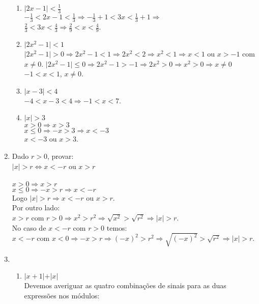 \documentclass[10pt]{book}
\begin{document}
\begin{enumerate}
\begin{enumerate}
		\item
		$\vert 2x - 1 \vert < \frac{1}{3}$\\
		$-\frac{1}{3} < 2x - 1 < \frac{1}{3} \Rightarrow -\frac{1}{3} + 1 < 3x < \frac{1}{3} + 1 \Rightarrow$\\
		$\frac{2}{3} < 3x < \frac{4}{3} \Rightarrow \frac{2}{9} < x < \frac{4}{9}$.
		\item
		$\vert 2x^2 - 1 \vert < 1$\\
		$\vert 2x^2 - 1 \vert > 0 \Rightarrow 2x^2 - 1 < 1 \Rightarrow 2x^2 < 2 \Rightarrow x^2 < 1 \Rightarrow x < 1$ ou $x > -1$ com $x \neq 0$.
		$\vert 2x^2 - 1 \vert \leq 0 \Rightarrow 2x^2 - 1 > -1 \Rightarrow 2x^2 > 0 \Rightarrow x^2 > 0 \Rightarrow x \neq 0$\\
		$-1 < x < 1$, $x \neq 0$.
		\item
		$\vert x - 3 \vert < 4$\\
		$-4 <  x - 3 < 4 \Rightarrow -1 < x < 7$.
		\item
		$\vert x \vert > 3$\\		
		$x > 0 \Rightarrow x > 3$\\
		$x \leq 0 \Rightarrow -x > 3 \Rightarrow x < -3$\\
		$x < -3$ ou $x > 3$.
	\end{enumerate}
	\item 
		Dado $r > 0$, provar: \\
		$\vert x \vert > r \Leftrightarrow x < -r$ ou $x > r$\\\\
		$x > 0 \Rightarrow x > r$\\
		$x \leq 0 \Rightarrow -x > r \Rightarrow x < -r$\\
		Logo $\vert x \vert > r \Rightarrow x < -r$ ou $x > r$.\\
		Por outro lado:\\
		$x > r$ com $r > 0 \Rightarrow x^2 > r^2 \Rightarrow \sqrt{x^2} > \sqrt{r^2} \Rightarrow \vert x \vert > r$.\\
		No caso de $x < -r$ com $r > 0$ temos:\\
		$x < -r$ com $x < 0 \Rightarrow -x > r \Rightarrow (-x)^2 > r^2\Rightarrow \sqrt{(-x)^2} > \sqrt{r^2} \Rightarrow \vert x \vert > r$.\\
	\item
		\begin{enumerate}
			\item
			$\vert x + 1 \vert + \vert x \vert$\\
			Devemos averiguar as quatro combinações de sinais para as duas expressões nos módulos:\\

\end{enumerate}
\end{enumerate}
\end{document}
